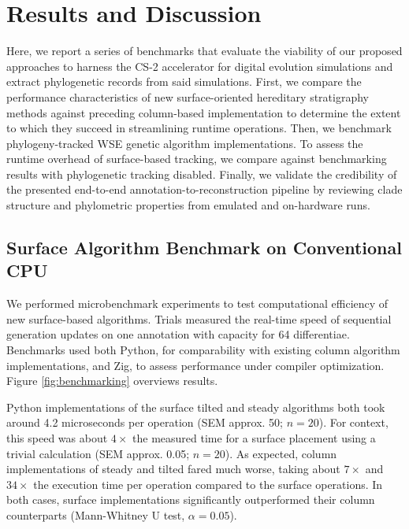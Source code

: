 \section{Results and Discussion} \label{sec:results}

Here, we report a series of benchmarks that evaluate the viability of our proposed approaches to harness the CS-2 accelerator for digital evolution simulations and extract phylogenetic records from said simulations.
First, we compare the performance characteristics of new surface-oriented hereditary stratigraphy methods against preceding column-based implementation to determine the extent to which they succeed in streamlining runtime operations.
Then, we benchmark phylogeny-tracked WSE genetic algorithm implementations.
To assess the runtime overhead of surface-based tracking, we compare against benchmarking results with phylogenetic tracking disabled.
Finally, we validate the credibility of the presented end-to-end annotation-to-reconstruction pipeline by reviewing clade structure and phylometric properties from emulated and on-hardware runs.

\subsection{Surface Algorithm Benchmark on Conventional CPU}



We performed microbenchmark experiments to test computational efficiency of new surface-based algorithms.
Trials measured the real-time speed of sequential generation updates on one annotation with capacity for 64 differentiae.
Benchmarks used both Python, for comparability with existing column algorithm implementations, and Zig, to assess performance under compiler optimization.
Figure \ref{fig:benchmarking} overviews results.

Python implementations of the surface tilted and steady algorithms both took around 4.2 microseconds per operation (SEM approx. 50; $n=20$).
For context, this speed was about $4\times$ the measured time for a surface placement using a trivial calculation (SEM approx. 0.05; $n=20$).
As expected, column implementations of steady and tilted fared much worse, taking about $7\times$ and $34\times$ the execution time per operation compared to the surface operations.
In both cases, surface implementations significantly outperformed their column counterparts (Mann-Whitney U test, $\alpha = 0.05$).

